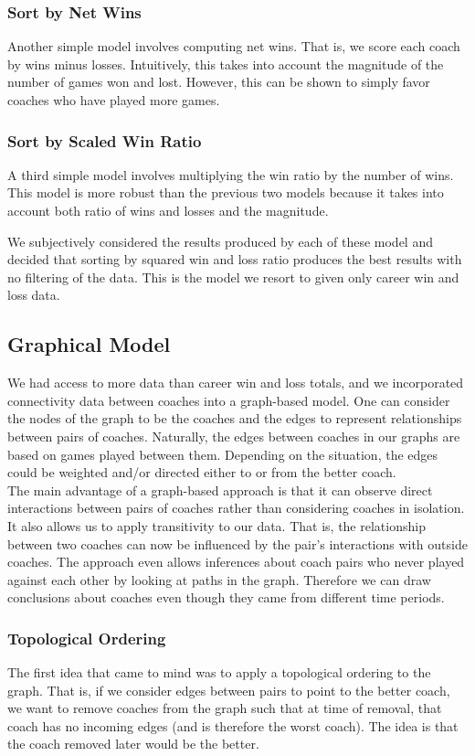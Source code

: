 \documentclass[titlepage,11pt]{article}
\begin{document}
\subsubsection{Sort by Net Wins}
Another simple model involves computing net wins. That is, we score each coach by wins minus losses. Intuitively, this takes into account the magnitude of the number of games won and lost. However, this can be shown to simply favor coaches who have played more games. 

\subsubsection{Sort by Scaled Win Ratio}
A third simple model involves multiplying the win ratio by the number of wins. This model is more robust than the previous two models because it takes into account both ratio of wins and losses and the magnitude. 

We subjectively considered the results produced by each of these model and decided that sorting by squared win and loss ratio produces the best results with no filtering of the data. This is the model we resort to given only career win and loss data.

\subsection{Graphical Model}
We had access to more data than career win and loss totals, and we incorporated connectivity data between coaches into a graph-based model. One can consider the nodes of the graph to be the coaches and the edges to represent relationships between pairs of coaches. Naturally, the edges between coaches in our graphs are based on games played between them. Depending on the situation, the edges could be weighted and/or directed either to or from the better coach.
\\

\noindent The main advantage of a graph-based approach is that it can observe direct interactions between pairs of coaches rather than considering coaches in isolation. It also allows us to apply transitivity to our data. That is, the relationship between two coaches can now be influenced by the pair's interactions with outside coaches. The approach even allows inferences about coach pairs who never played against each other by looking at paths in the graph. Therefore we can draw conclusions about coaches even though they came from different time periods.

\subsubsection{Topological Ordering}
The first idea that came to mind was to apply a topological ordering to the graph. That is, if we consider edges between pairs to point to the better coach, we want to remove coaches from the graph such that at time of removal, that coach has no incoming edges (and is therefore the worst coach). The idea is that the coach removed later would be the better.
\\
\end{document}
